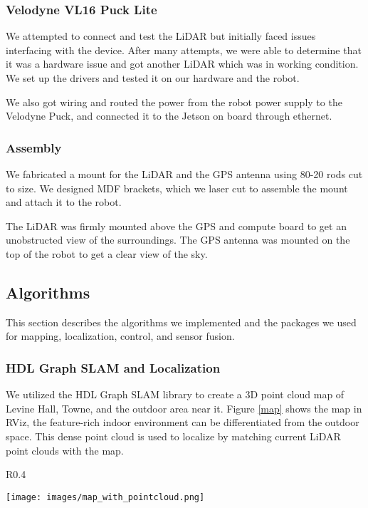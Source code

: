 \documentclass[10pt, reqno, letterpaper, twoside]{amsart}
\begin{document}
\subsubsection{\textbf{Velodyne VL16 Puck Lite}}

We attempted to connect and test the LiDAR but initially faced issues interfacing with the device. After many attempts, we were able to determine that it was a hardware issue and got another LiDAR which was in working condition. We set up the drivers and tested it on our hardware and the robot.

We also got wiring and routed the power from the robot power supply to the Velodyne Puck, and connected it to the Jetson on board through ethernet. 

\subsubsection{\textbf{Assembly}}
We fabricated a mount for the LiDAR and the GPS antenna using 80-20 rods cut to size. We designed MDF brackets, which we laser cut to assemble the mount and attach it to the robot. 

The LiDAR was firmly mounted above the GPS and compute board to get an unobstructed view of the surroundings. The GPS antenna was mounted on the top of the robot to get a clear view of the sky.

\subsection{Algorithms}
This section describes the algorithms we implemented and the packages we used for mapping, localization, control, and sensor fusion.
\subsubsection{\textbf{HDL Graph SLAM and Localization}}
We utilized the HDL Graph SLAM library \cite{hdl2019} to create a 3D point cloud map of Levine Hall, Towne, and the outdoor area near it. Figure \ref{map} shows the map in RViz, the feature-rich indoor environment can be differentiated from the outdoor space. This dense point cloud is used to localize by matching current LiDAR point clouds with the map. 
\begin{wrapfigure}{R}{0.4\textwidth}
  \begin{center}
    \texttt{[image: images/map\_with\_pointcloud.png]}
  \end{center}
    \caption{Map of Levine Hall, Towne and the outdoor area near it}
    \label{map}
\end{wrapfigure}
\end{document}
